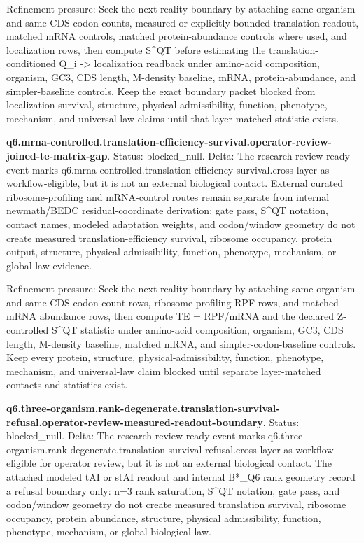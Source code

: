 Refinement pressure: Seek the next reality boundary by attaching same-organism and same-CDS codon counts, measured or explicitly bounded translation readout, matched mRNA controls, matched protein-abundance controls where used, and localization rows, then compute S\textasciicircum{}QT before estimating the translation-conditioned Q\_i -> localization readback under amino-acid composition, organism, GC3, CDS length, M-density baseline, mRNA, protein-abundance, and simpler-baseline controls. Keep the exact boundary packet blocked from localization-survival, structure, physical-admissibility, function, phenotype, mechanism, and universal-law claims until that layer-matched statistic exists.

\textbf{q6.mrna-controlled.translation-efficiency-survival.operator-review-joined-te-matrix-gap}. Status: blocked\_null. Delta: The research-review-ready event marks q6.mrna-controlled.translation-efficiency-survival.cross-layer as workflow-eligible, but it is not an external biological contact. External curated ribosome-profiling and mRNA-control routes remain separate from internal newmath/BEDC residual-coordinate derivation: gate pass, S\textasciicircum{}QT notation, contact names, modeled adaptation weights, and codon/window geometry do not create measured translation-efficiency survival, ribosome occupancy, protein output, structure, physical admissibility, function, phenotype, mechanism, or global-law evidence.

Refinement pressure: Seek the next reality boundary by attaching same-organism and same-CDS codon-count rows, ribosome-profiling RPF rows, and matched mRNA abundance rows, then compute TE = RPF/mRNA and the declared Z-controlled S\textasciicircum{}QT statistic under amino-acid composition, organism, GC3, CDS length, M-density baseline, matched mRNA, and simpler-codon-baseline controls. Keep every protein, structure, physical-admissibility, function, phenotype, mechanism, and universal-law claim blocked until separate layer-matched contacts and statistics exist.

\textbf{q6.three-organism.rank-degenerate.translation-survival-refusal.operator-review-measured-readout-boundary}. Status: blocked\_null. Delta: The research-review-ready event marks q6.three-organism.rank-degenerate.translation-survival-refusal.cross-layer as workflow-eligible for operator review, but it is not an external biological contact. The attached modeled tAI or stAI readout and internal B*\_Q6 rank geometry record a refusal boundary only: n=3 rank saturation, S\textasciicircum{}QT notation, gate pass, and codon/window geometry do not create measured translation survival, ribosome occupancy, protein abundance, structure, physical admissibility, function, phenotype, mechanism, or global biological law.

